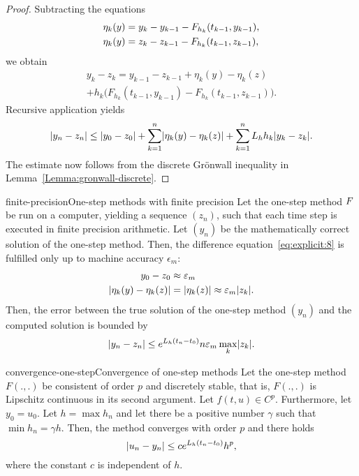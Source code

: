 

\begin{proof}
  Subtracting the equations
  \begin{align*}
    \eta_k(y) &= y_k-y_{k-1} - F_{h_k}(t_{k-1},y_{k-1}),
    \\
    \eta_k(y) &= z_k-z_{k-1} - F_{h_k}(t_{k-1},z_{k-1}),
  \end{align*}
  we obtain
  \begin{multline*}
    y_k-z_k = y_{k-1} - z_{k-1} + \eta_k(y) - \eta_k(z)
    \\
    + h_k \bigl(
      F_{h_k}(t_{k-1},y_{k-1})-F_{h_k}(t_{k-1},z_{k-1})
    \bigr)
    .
  \end{multline*}
  Recursive application yields
  \begin{gather*}
    \lvert y_n-z_n\rvert \le \lvert y_0-z_0\rvert
    + \sum_{k=1}^n \lvert\eta_k(y)-\eta_k(z)\rvert
    + \sum_{k=1}^n L_h h_{k} \lvert y_k-z_k\rvert.
  \end{gather*}
  The estimate now follows from the discrete Grönwall inequality in
  Lemma~\ref{Lemma:gronwall-discrete}.
\end{proof}

\begin{Corollary*}{finite-precision}{One-step methods with finite precision}
  Let the one-step method $F$ be run on a computer, yielding
  a sequence $(z_n)$, such that each time step is executed in finite
  precision arithmetic. Let $(y_n)$ be the mathematically correct
  solution of the one-step method. Then, the difference
  equation~\eqref{eq:explicit:8} is fulfilled only up to machine
  accuracy $\epsilon_m$:
  \begin{align*}
    y_0-z_0 &\approx \varepsilon_m \\
    \lvert\eta_k(y) - \eta_k(z)\rvert &= \lvert\eta_k(z)\rvert \approx \varepsilon_m \lvert z_k\rvert.
  \end{align*}
  Then, the error between the true solution of the one-step method
  $(y_n)$ and the computed solution is bounded by
  \begin{gather*}
    \lvert y_n-z_n\rvert \le e^{L_h(t_n-t_0)} n \varepsilon_m \max_k\lvert z_k\rvert.
  \end{gather*}
\end{Corollary*}

\begin{Theorem*}{convergence-one-step}{Convergence of one-step methods}
  Let the one-step method $F(.,.)$ be consistent of order $p$ and
  discretely stable, that is, $F(.,.)$ is Lipschitz continuous in its
  second argument. Let $f(t,u)\in C^{p}$. Furthermore, let
  $y_0 = u_0$. Let $h = \max h_n$ and let there be a positive number
  $\gamma$ such that $\min h_n = \gamma h$. Then, the method converges
  with order $p$ and there holds
  \begin{equation}
    \label{eq:convergence-onestep:1}
    \lvert u_n - y_n\rvert \le c e^{L_h(t_n-t_0)} h^p,
  \end{equation}
  where the constant $c$ is independent of $h$.
\end{Theorem*}

